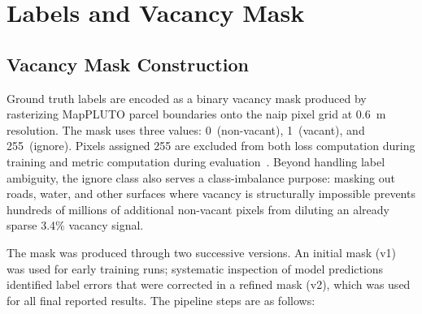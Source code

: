 \section{Labels and Vacancy Mask}
\label{sec:vacancy_mask}

\subsection{Vacancy Mask Construction}

Ground truth labels are encoded as a binary vacancy mask produced by rasterizing MapPLUTO parcel boundaries onto the \acrshort{naip} pixel grid at 0.6~m resolution. The mask uses three values: 0~(non-vacant), 1~(vacant), and 255~(ignore). Pixels assigned 255 are excluded from both loss computation during training and metric computation during evaluation~\cite{everingham2010pascal}. Beyond handling label ambiguity, the ignore class also serves a class-imbalance purpose: masking out roads, water, and other surfaces where vacancy is structurally impossible prevents hundreds of millions of additional non-vacant pixels from diluting an already sparse 3.4\% vacancy signal.

The mask was produced through two successive versions. An initial mask (v1) was used for early training runs; systematic inspection of model predictions identified label errors that were corrected in a refined mask (v2), which was used for all final reported results. The pipeline steps are as follows:

